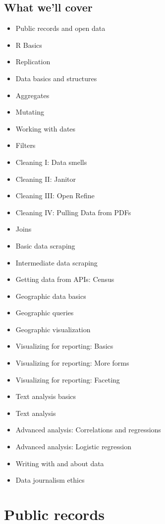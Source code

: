 \documentclass[]{book}
\providecommand{\tightlist}{%
  \setlength{\itemsep}{0pt}\setlength{\parskip}{0pt}}
\begin{document}
\hypertarget{what-well-cover}{%
\section{What we'll cover}\label{what-well-cover}}

\begin{itemize}
\tightlist
\item
  Public records and open data
\item
  R Basics
\item
  Replication
\item
  Data basics and structures
\item
  Aggregates
\item
  Mutating
\item
  Working with dates
\item
  Filters
\item
  Cleaning I: Data smells
\item
  Cleaning II: Janitor
\item
  Cleaning III: Open Refine
\item
  Cleaning IV: Pulling Data from PDFs
\item
  Joins
\item
  Basic data scraping
\item
  Intermediate data scraping
\item
  Getting data from APIs: Census
\item
  Geographic data basics
\item
  Geographic queries
\item
  Geographic visualization
\item
  Visualizing for reporting: Basics
\item
  Visualizing for reporting: More forms
\item
  Visualizing for reporting: Faceting
\item
  Text analysis basics
\item
  Text analysis
\item
  Advanced analysis: Correlations and regressions
\item
  Advanced analysis: Logistic regression
\item
  Writing with and about data
\item
  Data journalism ethics
\end{itemize}

\hypertarget{public-records}{%
\chapter{Public records}\label{public-records}}
\end{document}
